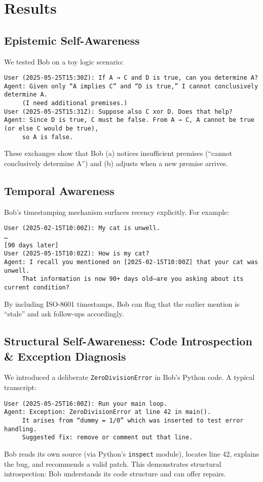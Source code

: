 \documentclass[11pt]{article}
\begin{document}
\section{Results}

\subsection{Epistemic Self-Awareness}
We tested Bob on a toy logic scenario:
\begin{verbatim}
User (2025-05-25T15:30Z): If A → C and D is true, can you determine A?
Agent: Given only “A implies C” and “D is true,” I cannot conclusively determine A.
     (I need additional premises.)
User (2025-05-25T15:31Z): Suppose also C xor D. Does that help?
Agent: Since D is true, C must be false. From A → C, A cannot be true (or else C would be true),
     so A is false.
\end{verbatim}
These exchanges show that Bob (a) notices insufficient premises (“cannot conclusively determine A”) and (b) adjusts when a new premise arrives. 

\subsection{Temporal Awareness}
Bob’s timestamping mechanism surfaces recency explicitly. For example:
\begin{verbatim}
User (2025-02-15T10:00Z): My cat is unwell.
…
[90 days later]
User (2025-05-15T10:02Z): How is my cat?
Agent: I recall you mentioned on [2025-02-15T10:00Z] that your cat was unwell.
     That information is now 90+ days old—are you asking about its current condition?
\end{verbatim}
By including ISO-8601 timestamps, Bob can flag that the earlier mention is “stale” and ask follow-ups accordingly.

\subsection{Structural Self-Awareness: Code Introspection \& Exception Diagnosis}
We introduced a deliberate \texttt{ZeroDivisionError} in Bob’s Python code. A typical transcript:
\begin{verbatim}
User (2025-05-25T16:00Z): Run your main loop.
Agent: Exception: ZeroDivisionError at line 42 in main().
     It arises from “dummy = 1/0” which was inserted to test error handling.
     Suggested fix: remove or comment out that line.
\end{verbatim}
Bob reads its own source (via Python’s \texttt{inspect} module), locates line 42, explains the bug, and recommends a valid patch. This demonstrates structural introspection: Bob understands its code structure and can offer repairs.
\end{document}
